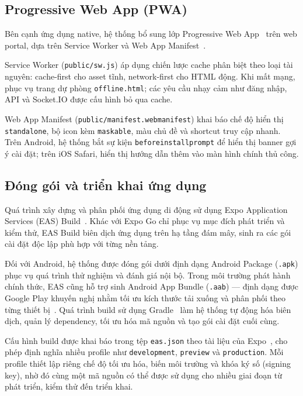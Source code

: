 \documentclass[../DoAn.tex]{subfiles}
\begin{document}
\subsection{Progressive Web App (PWA)}
\label{subsec:pwa}

Bên cạnh ứng dụng native, hệ thống bổ sung lớp Progressive Web
App~\cite{webdev_pwa} trên web portal, dựa trên Service Worker và Web App
Manifest~\cite{w3c_manifest}.

Service Worker (\texttt{public/sw.js}) áp dụng chiến lược cache phân biệt theo
loại tài nguyên: cache-first cho asset tĩnh, network-first cho HTML động.
Khi mất mạng, phục vụ trang dự phòng \texttt{offline.html}; các yêu cầu nhạy
cảm như đăng nhập, API và Socket.IO được cấu hình bỏ qua cache.

Web App Manifest (\texttt{public/manifest.webmanifest}) khai báo chế độ hiển
thị \texttt{standalone}, bộ icon kèm \texttt{maskable}, màu chủ đề và shortcut
truy cập nhanh. Trên Android, hệ thống bắt sự kiện
\texttt{beforeinstallprompt} để hiển thị banner gợi ý cài đặt; trên iOS Safari,
hiển thị hướng dẫn thêm vào màn hình chính thủ công.

\subsection{Đóng gói và triển khai ứng dụng}
\label{subsec:mobile_deployment}

Quá trình xây dựng và phân phối ứng dụng di động sử dụng
Expo Application Services (EAS) Build~\cite{expo_eas_build}. Khác với
Expo Go chỉ phục vụ mục đích phát triển và kiểm thử, EAS Build biên dịch
ứng dụng trên hạ tầng đám mây, sinh ra các gói cài đặt độc lập phù hợp với
từng nền tảng.

Đối với Android, hệ thống được đóng gói dưới định dạng Android Package
(\texttt{.apk}) phục vụ quá trình thử nghiệm và đánh giá nội bộ. Trong môi
trường phát hành chính thức, EAS cũng hỗ trợ sinh Android App Bundle
(\texttt{.aab}) --- định dạng được Google Play khuyến nghị nhằm tối ưu kích
thước tải xuống và phân phối theo từng thiết bị~\cite{android_app_bundle}.
Quá trình build sử dụng Gradle~\cite{gradle_docs} làm hệ thống tự động hóa
biên dịch, quản lý dependency, tối ưu hóa mã nguồn và tạo gói cài đặt cuối
cùng.

Cấu hình build được khai báo trong tệp \texttt{eas.json} theo tài liệu của
Expo~\cite{expo_eas_json}, cho phép định nghĩa nhiều profile như
\texttt{development}, \texttt{preview} và \texttt{production}. Mỗi profile
thiết lập riêng chế độ tối ưu hóa, biến môi trường và khóa ký số (signing
key), nhờ đó cùng một mã nguồn có thể được sử dụng cho nhiều giai đoạn từ
phát triển, kiểm thử đến triển khai.
\end{document}
